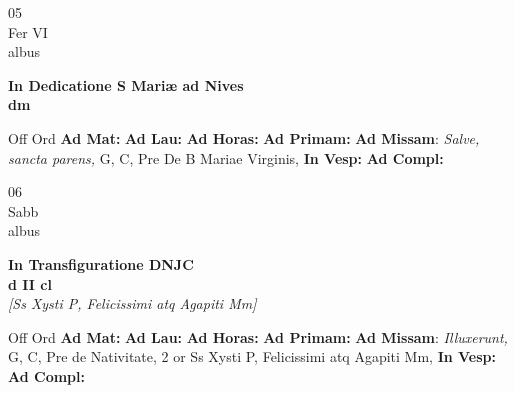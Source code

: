 \documentclass[10pt, openany]{book}
\begin{document}
        \begin{center}
            \begin{minipage}{3.5in}
                \vspace{2em}
                \begin{minipage}{0.5in}
                    {\Huge 05} \\
                    {\normalsize Fer VI} \\
                    {\normalsize albus}
                \end{minipage}
                \begin{minipage}{3.0in}
                    \textbf{ \large In Dedicatione S Mariæ ad Nives \\
                    \textnormal{\normalsize dm}} \\ 
                \end{minipage}
                \begin{justify}Off Ord
                    \textbf{Ad Mat: }
                    \textbf{Ad Lau: }
                    \textbf{Ad Horas: }
                    \textbf{Ad Primam: }\textbf{Ad Missam}: \textit{Salve, sancta parens,} G, C, Pre De B Mariae Virginis,  
                    \textbf{In Vesp: }
                    \textbf{Ad Compl: }
                \end{justify}
            \end{minipage}
        \end{center}
    
        \begin{center}
            \begin{minipage}{3.5in}
                \vspace{2em}
                \begin{minipage}{0.5in}
                    {\Huge 06} \\
                    {\normalsize Sabb} \\
                    {\normalsize albus}
                \end{minipage}
                \begin{minipage}{3.0in}
                    \textbf{ \large In Transfiguratione DNJC \\
                    \textnormal{\normalsize d II cl}} \\ \textit{[Ss Xysti P, Felicissimi atq Agapiti Mm]} \\ 
                \end{minipage}
                \begin{justify}Off Ord
                    \textbf{Ad Mat: }
                    \textbf{Ad Lau: }
                    \textbf{Ad Horas: }
                    \textbf{Ad Primam: }\textbf{Ad Missam}: \textit{Illuxerunt,} G, C, Pre de Nativitate, 2 or Ss Xysti P, Felicissimi atq Agapiti Mm,  
                    \textbf{In Vesp: }
                    \textbf{Ad Compl: }
                \end{justify}
            \end{minipage}
        \end{center}
    
\end{document}
